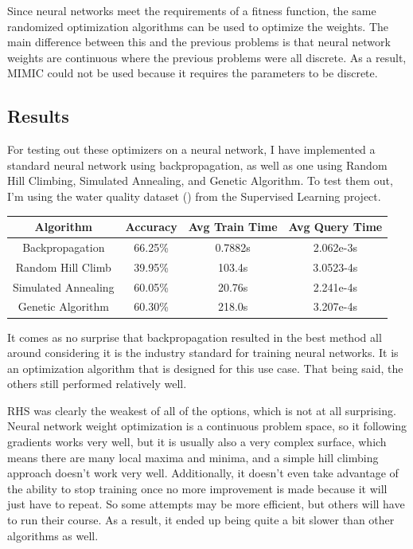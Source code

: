 \documentclass[
	letterpaper, %
]{mlreport}
\begin{document}
Since neural networks meet the requirements of a fitness function, the same randomized optimization algorithms can be used to optimize the weights. The main difference between this and the previous problems is that neural network weights are continuous where the previous problems were all discrete. As a result, MIMIC could not be used because it requires the parameters to be discrete.

\subsection{Results}
For testing out these optimizers on a neural network, I have implemented a standard neural network using backpropagation, as well as one using Random Hill Climbing, Simulated Annealing, and Genetic Algorithm. To test them out, I'm using the water quality dataset (\cite{water}) from the Supervised Learning project.
\begin{center}
	\begin{tabular}{|c||c|c|c|}
	 \hline
	 Algorithm & Accuracy & Avg Train Time & Avg Query Time \\
	 \hline\hline
	 Backpropagation & 66.25\% & 0.7882s & 2.062e-3s  \\
	 \hline
	 Random Hill Climb & 39.95\% & 103.4s & 3.0523-4s  \\
	 \hline
	 Simulated Annealing & 60.05\% & 20.76s & 2.241e-4s  \\
	 \hline
	 Genetic Algorithm & 60.30\% & 218.0s & 3.207e-4s  \\
	 \hline
	\end{tabular}
	\label{table:table3}
\end{center}

It comes as no surprise that backpropagation resulted in the best method all around considering it is the industry standard for training neural networks. It is an optimization algorithm that is designed for this use case. That being said, the others still performed relatively well.

RHS was clearly the weakest of all of the options, which is not at all surprising. Neural network weight optimization is a continuous problem space, so it following gradients works very well, but it is usually also a very complex surface, which means there are many local maxima and minima, and a simple hill climbing approach doesn't work very well. Additionally, it doesn't even take advantage of the ability to stop training once no more improvement is made because it will just have to repeat. So some attempts may be more efficient, but others will have to run their course. As a result, it ended up being quite a bit slower than other algorithms as well.
\end{document}
